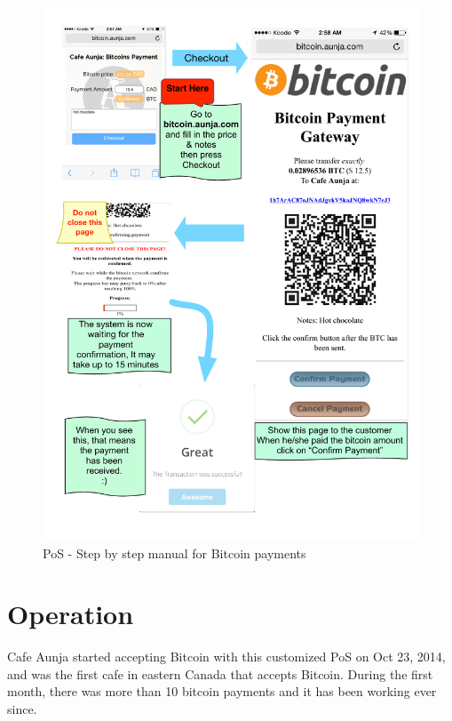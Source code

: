 \begin{figure}[htb]
\centering
\includegraphics[width=\linewidth]{fig/Payment_manual.pdf}
  \caption{PoS - Step by step manual for Bitcoin payments}
\label{fig:payment_manual}
\end{figure}



\section{Operation}
Cafe Aunja started accepting Bitcoin with this customized PoS on Oct 23, 2014, and was the first cafe in eastern Canada that accepts Bitcoin. During the first month, there was more than 10 bitcoin payments and it has been working ever since.

